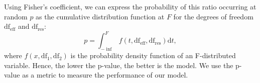 Using Fisher's coefficient, we can express the probability of this ratio occurring at random $p$ as the cumulative distribution function at $F$ for the degrees of freedom $\text{df}_\text{eff}$ and $\text{df}_\text{res}$:
\begin{equation}
	p = \int_{-\inf}^F f(t,\text{df}_\text{eff},\text{df}_\text{res}) \mathrm{d}t,
\end{equation}
where $f(x,\text{df}_1,\text{df}_2)$ is the probability density function of an F-distributed variable. Hence, the lower the p-value, the better is the model. We use the p-value as a metric to measure the performance of our model.